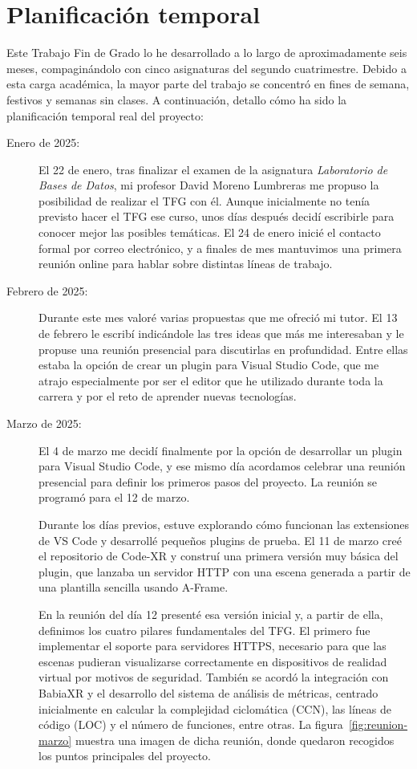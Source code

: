 \documentclass[a4paper, 12pt]{book}
\begin{document}
\section{Planificación temporal}
\label{sec:planificacion-temporal}

Este Trabajo Fin de Grado lo he desarrollado a lo largo de aproximadamente seis meses, compaginándolo con cinco asignaturas del segundo cuatrimestre. Debido a esta carga académica, la mayor parte del trabajo se concentró en fines de semana, festivos y semanas sin clases. A continuación, detallo cómo ha sido la planificación temporal real del proyecto:

\begin{description}
    \item[Enero de 2025:] El 22 de enero, tras finalizar el examen de la asignatura \textit{Laboratorio de Bases de Datos}, mi profesor David Moreno Lumbreras me propuso la posibilidad de realizar el TFG con él. Aunque inicialmente no tenía previsto hacer el TFG ese curso, unos días después decidí escribirle para conocer mejor las posibles temáticas. El 24 de enero inicié el contacto formal por correo electrónico, y a finales de mes mantuvimos una primera reunión online para hablar sobre distintas líneas de trabajo.

    \item[Febrero de 2025:] Durante este mes valoré varias propuestas que me ofreció mi tutor. El 13 de febrero le escribí indicándole las tres ideas que más me interesaban y le propuse una reunión presencial para discutirlas en profundidad. Entre ellas estaba la opción de crear un plugin para Visual Studio Code, que me atrajo especialmente por ser el editor que he utilizado durante toda la carrera y por el reto de aprender nuevas tecnologías.

    \item[Marzo de 2025:] El 4 de marzo me decidí finalmente por la opción de desarrollar un plugin para Visual Studio Code, y ese mismo día acordamos celebrar una reunión presencial para definir los primeros pasos del proyecto. La reunión se programó para el 12 de marzo.

    Durante los días previos, estuve explorando cómo funcionan las extensiones de VS Code y desarrollé pequeños plugins de prueba. El 11 de marzo creé el repositorio de Code-XR y construí una primera versión muy básica del plugin, que lanzaba un servidor HTTP con una escena generada a partir de una plantilla sencilla usando A-Frame.

    En la reunión del día 12 presenté esa versión inicial y, a partir de ella, definimos los cuatro pilares fundamentales del TFG. El primero fue implementar el soporte para servidores HTTPS, necesario para que las escenas pudieran visualizarse correctamente en dispositivos de realidad virtual por motivos de seguridad. También se acordó la integración con BabiaXR y el desarrollo del sistema de análisis de métricas, centrado inicialmente en calcular la complejidad ciclomática (CCN), las líneas de código (LOC) y el número de funciones, entre otras. La figura~\ref{fig:reunion-marzo} muestra una imagen de dicha reunión, donde quedaron recogidos los puntos principales del proyecto.


\end{description}
\end{document}
